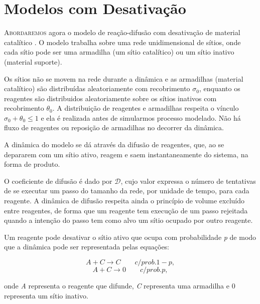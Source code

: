 
\section{Modelos com Desativação}

\lettrine{A}{bordaremos} agora o modelo de reação-difusão com desativação de material
catalítico \cite{7}. O modelo trabalha sobre uma rede unidimensional de
sítios, onde cada sítio pode ser uma armadilha (um sítio catalítico) ou um sítio
inativo (material suporte).

Os sítios não se movem na rede durante a dinâmica e
as armadilhas (material catalítico) são distribuídas aleatoriamente com
recobrimento $\sigma_0$, enquanto os reagentes são distribuidos aleatoriamente
sobre os sítios inativos com recobrimento $\theta_0$. A distribuição de
reagentes e armadilhas respeita o vínculo $\sigma_0 + \theta_0 \leq 1$ e ela é
realizada antes de simularmos processo modelado. Não há fluxo de reagentes ou
reposição de armadilhas no decorrer da dinâmica.

A dinâmica do modelo se dá através da difusão de reagentes, que, ao se depararem
com um sítio ativo, reagem e saem instantaneamente do sistema, na forma de
produto.

O coeficiente de difusão é dado por $\mathcal{D}$, cujo valor expressa
o número de tentativas de se executar um passo do tamanho da rede, por unidade
de tempo, para cada reagente. A dinâmica de difusão respeita ainda o princípio
de volume excluído entre reagentes, de forma que um reagente tem execução de um
passo rejeitada quando a intenção do passo tem como alvo um sítio ocupado por
outro reagente.

Um reagente pode desativar o sítio ativo que ocupa com probabilidade \textit{p}
de modo que a dinâmica pode ser representada pelas equações:

{
\setlength{\belowdisplayskip}{0pt} \setlength{\belowdisplayshortskip}{0pt}
\setlength{\abovedisplayskip}{0pt} \setlength{\abovedisplayshortskip}{0pt}

\begin{equation}
  A + C \longrightarrow C \qquad c/ prob. 1 - p,
  \label{Equation-031-ModeloTradicional}
\end{equation}
\begin{equation}
  A + C \longrightarrow 0 \qquad c/ prob. p,
  \label{Equation-032-ModeloEnvenenamento}
\end{equation}
}

\noindent onde \textit{A} representa o reagente que difunde, \textit{C}
representa uma armadilha e 0 representa um sítio inativo.

